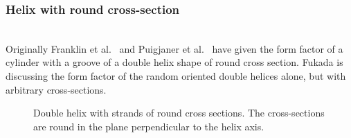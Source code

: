 \subsubsection{Helix with round cross-section} ~\\
Originally Franklin et al.\ \cite{Franklin1956} and Puigjaner et al.\ \cite{Puigjaner1974} have given the form factor of a cylinder with a groove of a double helix shape of round cross section. Fukada \cite{Fukuda2002} is discussing the form factor of the random oriented double helices alone, but with arbitrary cross-sections.
\begin{figure}[htb]
\begin{center}
\hfill
\end{center}
\caption{Double helix with strands of round cross sections. The cross-sections are round in the plane perpendicular to the helix axis.} \label{fig:roundhelix}
\end{figure}

